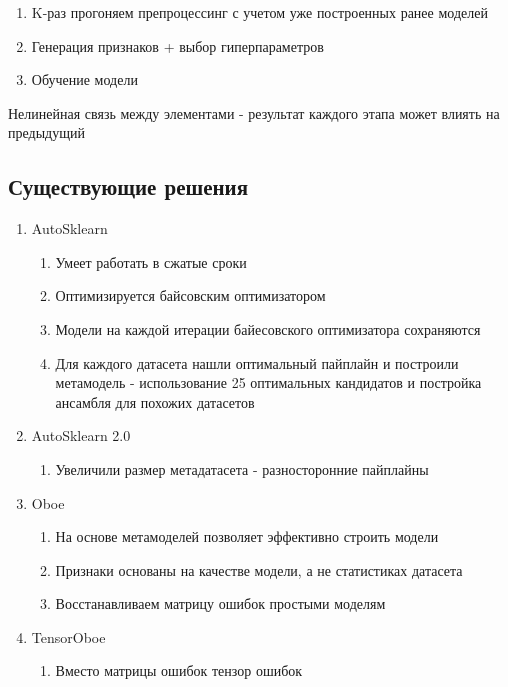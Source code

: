 \documentclass[a4paper, 12pt]{article}
\begin{document}
\begin{enumerate}
    \item K-раз прогоняем препроцессинг с учетом уже построенных ранее моделей
    \item Генерация признаков + выбор гиперпараметров
    \item Обучение модели
\end{enumerate}

Нелинейная связь между элементами - результат каждого этапа 
может влиять на предыдущий

\subsection{Существующие решения}

\begin{enumerate}
    \item AutoSklearn
    \begin{enumerate}
        \item Умеет работать в сжатые сроки
        \item Оптимизируется байсовским оптимизатором
        \item Модели на каждой итерации байесовского оптимизатора сохраняются
        \item Для каждого датасета нашли оптимальный пайплайн и построили метамодель - 
        использование 25 оптимальных кандидатов и постройка ансамбля для похожих датасетов
    \end{enumerate}
    \item AutoSklearn 2.0
    \begin{enumerate}
        \item Увеличили размер метадатасета - разносторонние пайплайны
    \end{enumerate}
    \item Oboe
    \begin{enumerate}
        \item На основе метамоделей позволяет эффективно строить модели
        \item Признаки основаны на качестве модели, а не статистиках датасета
        \item Восстанавливаем матрицу ошибок простыми моделям
    \end{enumerate}
    \item TensorOboe
    \begin{enumerate}
        \item Вместо матрицы ошибок тензор ошибок
    \end{enumerate}

\end{enumerate}
\end{document}
